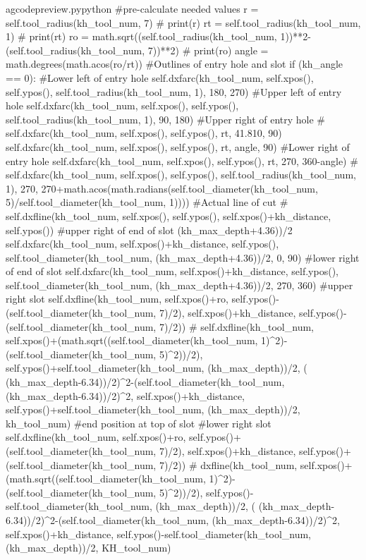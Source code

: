\documentclass{ltxdoc}
\begin{document}
\lstset{firstnumber=\thegcpy}
\begin{writecode}{a}{gcodepreview.py}{python}
#pre-calculate needed values
        r = self.tool_radius(kh_tool_num, 7)
#        print(r)
        rt = self.tool_radius(kh_tool_num, 1)
#        print(rt)
        ro = math.sqrt((self.tool_radius(kh_tool_num, 1))**2-(self.tool_radius(kh_tool_num, 7))**2)
#        print(ro)
        angle = math.degrees(math.acos(ro/rt))
#Outlines of entry hole and slot
        if (kh_angle == 0):
#Lower left of entry hole
            self.dxfarc(kh_tool_num, self.xpos(), self.ypos(), self.tool_radius(kh_tool_num, 1), 180, 270)
#Upper left of entry hole
            self.dxfarc(kh_tool_num, self.xpos(), self.ypos(), self.tool_radius(kh_tool_num, 1), 90, 180)
#Upper right of entry hole
#            self.dxfarc(kh_tool_num, self.xpos(), self.ypos(), rt, 41.810, 90)
            self.dxfarc(kh_tool_num, self.xpos(), self.ypos(), rt, angle, 90)
#Lower right of entry hole
            self.dxfarc(kh_tool_num, self.xpos(), self.ypos(), rt, 270, 360-angle)
#            self.dxfarc(kh_tool_num, self.xpos(), self.ypos(), self.tool_radius(kh_tool_num, 1), 270, 270+math.acos(math.radians(self.tool_diameter(kh_tool_num, 5)/self.tool_diameter(kh_tool_num, 1))))
#Actual line of cut
#            self.dxfline(kh_tool_num, self.xpos(), self.ypos(), self.xpos()+kh_distance, self.ypos())
#upper right of end of slot (kh_max_depth+4.36))/2
            self.dxfarc(kh_tool_num, self.xpos()+kh_distance, self.ypos(), self.tool_diameter(kh_tool_num, (kh_max_depth+4.36))/2, 0, 90)
#lower right of end of slot
            self.dxfarc(kh_tool_num, self.xpos()+kh_distance, self.ypos(), self.tool_diameter(kh_tool_num, (kh_max_depth+4.36))/2, 270, 360)
#upper right slot
            self.dxfline(kh_tool_num, self.xpos()+ro, self.ypos()-(self.tool_diameter(kh_tool_num, 7)/2), self.xpos()+kh_distance, self.ypos()-(self.tool_diameter(kh_tool_num, 7)/2))
#            self.dxfline(kh_tool_num, self.xpos()+(math.sqrt((self.tool_diameter(kh_tool_num, 1)^2)-(self.tool_diameter(kh_tool_num, 5)^2))/2), self.ypos()+self.tool_diameter(kh_tool_num, (kh_max_depth))/2, ( (kh_max_depth-6.34))/2)^2-(self.tool_diameter(kh_tool_num, (kh_max_depth-6.34))/2)^2, self.xpos()+kh_distance, self.ypos()+self.tool_diameter(kh_tool_num, (kh_max_depth))/2, kh_tool_num)
#end position at top of slot
#lower right slot
            self.dxfline(kh_tool_num, self.xpos()+ro, self.ypos()+(self.tool_diameter(kh_tool_num, 7)/2), self.xpos()+kh_distance, self.ypos()+(self.tool_diameter(kh_tool_num, 7)/2))
#        dxfline(kh_tool_num, self.xpos()+(math.sqrt((self.tool_diameter(kh_tool_num, 1)^2)-(self.tool_diameter(kh_tool_num, 5)^2))/2), self.ypos()-self.tool_diameter(kh_tool_num, (kh_max_depth))/2, ( (kh_max_depth-6.34))/2)^2-(self.tool_diameter(kh_tool_num, (kh_max_depth-6.34))/2)^2, self.xpos()+kh_distance, self.ypos()-self.tool_diameter(kh_tool_num, (kh_max_depth))/2, KH_tool_num)

\end{writecode}
\end{document}
